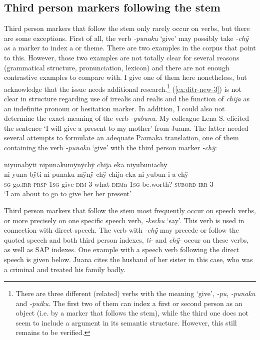 \subsection{Third person markers following the stem}\label{sec:3_suffixes}

Third person markers that follow the stem only rarely occur on verbs, but there are some exceptions. 
First of all, the  verb \textit{-punaku} ‘give’ may possibly take \textit{-chÿ} as a marker to index a  or theme. There are two examples in the corpus that point to this. However, those two examples are not totally clear for several reasons (grammatical structure, pronunciation, lexicon) and there are not enough contrastive examples to compare with. I give one of them here nonetheless, but acknowledge that the issue needs additional research.\footnote{There are three different (related) verbs with the meaning ‘give’, \textit{-pu}, \textit{-punaku} and \textit{-puiku}. The first two of them can index a first or second person  as an object (i.e. by a marker that follows the stem), while the third one does not seem to include a  argument in its semantic structure. However, this still remains to be verified.} (\ref{ex:ditr-new-3}) is not clear in structure regarding use of irrealis and realis and the function of \textit{chija} as an indefinite pronoun or hesitation marker. In addition, I could also not determine the exact meaning of the verb \textit{-yubunu}. My colleague Lena S. elicited the sentence ‘I will give a present to my mother’ from Juana. The latter needed several attempts to formulate an adequate Paunaka translation, one of them containing the verb \textit{-punaku} ‘give’ with the third person marker \textit{-chÿ}:

\ea\label{ex:ditr-new-3}
\begingl
\glpreamble niyunabÿti nipunakumÿnÿchÿ chija eka niyubuniachÿ\\
\gla ni-yuna-bÿti ni-punaku-mÿnÿ-chÿ chija eka ni-yubun-i-a-chÿ\\
\textsc{sg}-go.\textsc{irr}-\textsc{prsp} 1\textsc{sg}-give-\textsc{dim}-3 what \textsc{dem}a 1\textsc{sg}-be.worth?-\textsc{subord}-\textsc{irr}-3\\
\glft ‘I am about to go to give her her present’
\endgl
{}
\xe

Third person markers that follow the stem most frequently occur on speech verbs, or more precisely on one specific speech verb, \textit{-kechu} ‘say’. This verb is used in connection with direct speech. The verb with \textit{-chÿ} may precede or follow the quoted speech and both third person indexes, \textit{ti-} and \textit{chÿ-} occur on these verbs, as well as SAP indexes. One example with a speech verb following the direct speech is given below. Juana cites the husband of her sister in this case, who was a criminal and treated his family badly.


